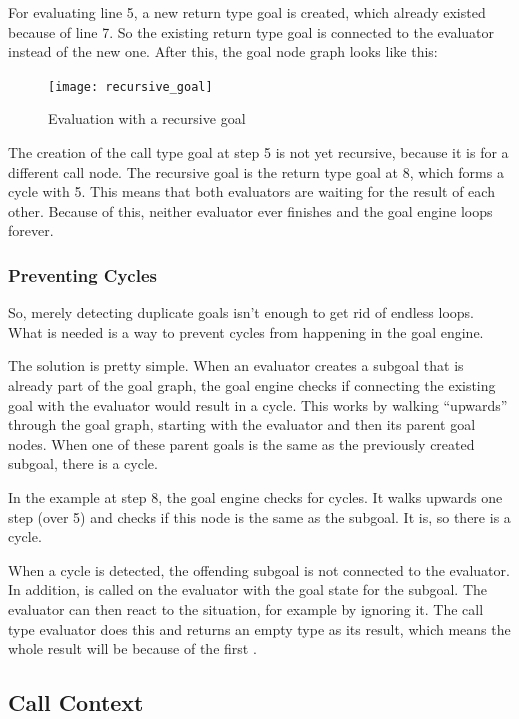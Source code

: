 \documentclass[12pt,halfparskip,DIV11,BCOR10mm]{scrreprt}
\begin{document}
For evaluating line 5, a new return type goal is created, which already existed because of line 7. So the existing return type goal is connected to the evaluator instead of the new one. After this, the goal node graph looks like this:

\begin{figure}[H]
	\centering
	\texttt{[image: recursive\_goal]}
	\label{fig:recursive_goal}
	\caption{Evaluation with a recursive goal}
\end{figure}

The creation of the call type goal at step 5 is not yet recursive, because it is for a different call node. The recursive goal is the return type goal at 8, which forms a cycle with 5. This means that both evaluators are waiting for the result of each other. Because of this, neither evaluator ever finishes and the goal engine loops forever.

\subsubsection{Preventing Cycles}

So, merely detecting duplicate goals isn't enough to get rid of endless loops. What is needed is a way to prevent cycles from happening in the goal engine.

The solution is pretty simple. When an evaluator creates a subgoal that is already part of the goal graph, the goal engine checks if connecting the existing goal with the evaluator would result in a cycle. This works by walking ``upwards'' through the goal graph, starting with the evaluator and then its parent goal nodes. When one of these parent goals is the same as the previously created subgoal, there is a cycle.

In the example at step 8, the goal engine checks for cycles. It walks upwards one step (over 5) and checks if this node is the same as the subgoal. It is, so there is a cycle.

When a cycle is detected, the offending subgoal is not connected to the evaluator. In addition,  is called on the evaluator with the  goal state for the subgoal. The evaluator can then react to the situation, for example by ignoring it. The call type evaluator does this and returns an empty type as its result, which means the whole result will be  because of the first .

\subsection{Call Context}
\end{document}
